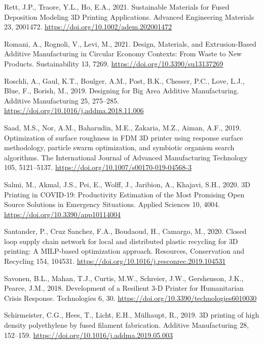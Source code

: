 \documentclass[
  12pt,
  number,
  review]{elsarticle}
\newlength{\cslhangindent}
\newlength{\cslentryspacingunit} %
\newenvironment{CSLReferences}[2] %
 {%
  \setlength{\parindent}{0pt}
  \ifodd #1
  \let\oldpar\par
  \def\par{\hangindent=\cslhangindent\oldpar}
  \fi
  \setlength{\parskip}{#2\cslentryspacingunit}
 }%
 {}
\begin{document}
\begin{CSLReferences}{1}{0}
\leavevmode{}%
Rett, J.P., Traore, Y.L., Ho, E.A., 2021. Sustainable {Materials} for
{Fused Deposition Modeling 3D Printing Applications}. Advanced
Engineering Materials 23, 2001472.
\url{https://doi.org/10.1002/adem.202001472}

\leavevmode{}%
Romani, A., Rognoli, V., Levi, M., 2021. Design, {Materials}, and
{Extrusion-Based Additive Manufacturing} in {Circular Economy Contexts}:
{From Waste} to {New Products}. Sustainability 13, 7269.
\url{https://doi.org/10.3390/su13137269}

\leavevmode{}%
Roschli, A., Gaul, K.T., Boulger, A.M., Post, B.K., Chesser, P.C., Love,
L.J., Blue, F., Borish, M., 2019. Designing for {Big Area Additive
Manufacturing}. Additive Manufacturing 25, 275--285.
\url{https://doi.org/10.1016/j.addma.2018.11.006}

\leavevmode{}%
Saad, M.S., Nor, A.M., Baharudin, M.E., Zakaria, M.Z., Aiman, A.F.,
2019. Optimization of surface roughness in {FDM 3D} printer using
response surface methodology, particle swarm optimization, and symbiotic
organism search algorithms. The International Journal of Advanced
Manufacturing Technology 105, 5121--5137.
\url{https://doi.org/10.1007/s00170-019-04568-3}

\leavevmode{}%
Salmi, M., Akmal, J.S., Pei, E., Wolff, J., Jaribion, A., Khajavi, S.H.,
2020. {3D Printing} in {COVID-19}: {Productivity Estimation} of the
{Most Promising Open Source Solutions} in {Emergency Situations}.
Applied Sciences 10, 4004. \url{https://doi.org/10.3390/app10114004}

\leavevmode{}%
Santander, P., Cruz Sanchez, F.A., Boudaoud, H., Camargo, M., 2020.
Closed loop supply chain network for local and distributed plastic
recycling for {3D} printing: A {MILP-based} optimization approach.
Resources, Conservation and Recycling 154, 104531.
\url{https://doi.org/10.1016/j.resconrec.2019.104531}

\leavevmode{}%
Savonen, B.L., Mahan, T.J., Curtis, M.W., Schreier, J.W., Gershenson,
J.K., Pearce, J.M., 2018. Development of a {Resilient} 3-{D Printer} for
{Humanitarian Crisis Response}. Technologies 6, 30.
\url{https://doi.org/10.3390/technologies6010030}

\leavevmode{}%
Schirmeister, C.G., Hees, T., Licht, E.H., Mülhaupt, R., 2019. {3D}
printing of high density polyethylene by fused filament fabrication.
Additive Manufacturing 28, 152--159.
\url{https://doi.org/10.1016/j.addma.2019.05.003}


\end{CSLReferences}
\end{document}
